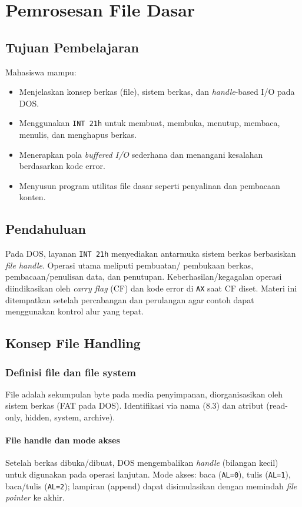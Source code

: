 \documentclass[../main.tex]{subfiles}
\begin{document}
\chapter{Pemrosesan File Dasar}

    \section{Tujuan Pembelajaran}
        Mahasiswa mampu:
        \begin{itemize}
            \item Menjelaskan konsep berkas (file), sistem berkas, dan \textit{handle}-based I/O pada DOS.
            \item Menggunakan \texttt{INT 21h} untuk membuat, membuka, menutup, membaca, menulis, dan menghapus berkas.
            \item Menerapkan pola \textit{buffered I/O} sederhana dan menangani kesalahan berdasarkan kode error.
            \item Menyusun program utilitas file dasar seperti penyalinan dan pembacaan konten.
        \end{itemize}

    \section{Pendahuluan}
        Pada DOS, layanan \texttt{INT 21h} menyediakan antarmuka sistem berkas berbasiskan \textit{file handle}. Operasi utama meliputi pembuatan/ pembukaan berkas, pembacaan/penulisan data, dan penutupan. Keberhasilan/kegagalan operasi diindikasikan oleh \textit{carry flag} (CF) dan kode error di \texttt{AX} saat CF diset. Materi ini ditempatkan setelah percabangan dan perulangan agar contoh dapat menggunakan kontrol alur yang tepat.

    \section{Konsep File Handling}
        \subsection{Definisi file dan file system}
            File adalah sekumpulan byte pada media penyimpanan, diorganisasikan oleh sistem berkas (FAT pada DOS). Identifikasi via nama (8.3) dan atribut (read-only, hidden, system, archive).

        \subsubsection{File handle dan mode akses}
            Setelah berkas dibuka/dibuat, DOS mengembalikan \textit{handle} (bilangan kecil) untuk digunakan pada operasi lanjutan. Mode akses: baca (\texttt{AL=0}), tulis (\texttt{AL=1}), baca/tulis (\texttt{AL=2}); lampiran (append) dapat disimulasikan dengan memindah \textit{file pointer} ke akhir.
\end{document}
